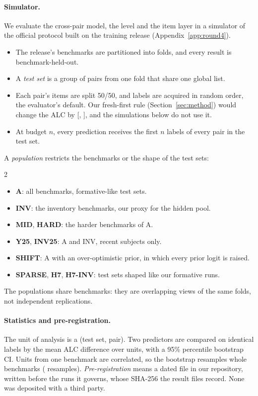 \documentclass{article}
\begin{document}
\paragraph{Simulator.} We evaluate the cross-pair model, the level and the item layer in a simulator of the official protocol built on the training release (Appendix~\ref{app:round4}).
\begin{itemize}
\item The release's benchmarks are partitioned into folds, and every result is benchmark-held-out.
\item A \emph{test set} is a group of pairs from one fold that share one global list.
\item Each pair's items are split 50/50, and labels are acquired in random order, the evaluator's default. Our fresh-first rule (Section~\ref{sec:method}) would change the ALC by \XpAcqMean{} [\XpAcqLo, \XpAcqHi], and the simulations below do not use it.
\item At budget $n$, every prediction receives the first $n$ labels of every pair in the test set.
\end{itemize}
A \emph{population} restricts the benchmarks or the shape of the test sets:
\begin{multicols}{2}
\begin{itemize}
\item \textbf{A}: all benchmarks, formative-like test sets.
\item \textbf{INV}: the \DdPopNInvBench{} inventory benchmarks, our proxy for the hidden pool.
\item \textbf{MID}, \textbf{HARD}: the harder benchmarks of A.
\item \textbf{Y25}, \textbf{INV25}: A and INV, recent subjects only.
\item \textbf{SHIFT}: A with an over-optimistic prior, in which every prior logit is raised.
\item \textbf{SPARSE}, \textbf{H7}, \textbf{H7-INV}: test sets shaped like our formative runs.
\end{itemize}
\end{multicols}
\noindent The populations share benchmarks: they are overlapping views of the same folds, not independent replications.

\paragraph{Statistics and pre-registration.} The unit of analysis is a (test set, pair). Two predictors are compared on identical labels by the mean ALC difference over units, with a 95\% percentile bootstrap CI. Units from one benchmark are correlated, so the bootstrap resamples whole benchmarks (\WcNBoot{} resamples). \emph{Pre-registration} means a dated file in our repository, written before the runs it governs, whose SHA-256 the result files record. None was deposited with a third party.
\end{document}
